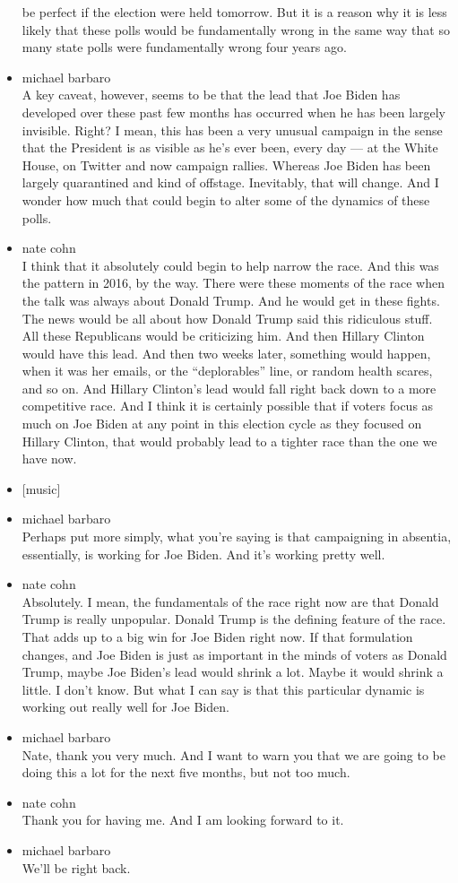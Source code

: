 \begin{itemize}
  be perfect if the election were held tomorrow. But it is a reason why
  it is less likely that these polls would be fundamentally wrong in the
  same way that so many state polls were fundamentally wrong four years
  ago.
\item
  michael barbaro\\
  A key caveat, however, seems to be that the lead that Joe Biden has
  developed over these past few months has occurred when he has been
  largely invisible. Right? I mean, this has been a very unusual
  campaign in the sense that the President is as visible as he's ever
  been, every day --- at the White House, on Twitter and now campaign
  rallies. Whereas Joe Biden has been largely quarantined and kind of
  offstage. Inevitably, that will change. And I wonder how much that
  could begin to alter some of the dynamics of these polls.
\item
  nate cohn\\
  I think that it absolutely could begin to help narrow the race. And
  this was the pattern in 2016, by the way. There were these moments of
  the race when the talk was always about Donald Trump. And he would get
  in these fights. The news would be all about how Donald Trump said
  this ridiculous stuff. All these Republicans would be criticizing him.
  And then Hillary Clinton would have this lead. And then two weeks
  later, something would happen, when it was her emails, or the
  ``deplorables'' line, or random health scares, and so on. And Hillary
  Clinton's lead would fall right back down to a more competitive race.
  And I think it is certainly possible that if voters focus as much on
  Joe Biden at any point in this election cycle as they focused on
  Hillary Clinton, that would probably lead to a tighter race than the
  one we have now.
\item
  {[}music{]}
\item
  michael barbaro\\
  Perhaps put more simply, what you're saying is that campaigning in
  absentia, essentially, is working for Joe Biden. And it's working
  pretty well.
\item
  nate cohn\\
  Absolutely. I mean, the fundamentals of the race right now are that
  Donald Trump is really unpopular. Donald Trump is the defining feature
  of the race. That adds up to a big win for Joe Biden right now. If
  that formulation changes, and Joe Biden is just as important in the
  minds of voters as Donald Trump, maybe Joe Biden's lead would shrink a
  lot. Maybe it would shrink a little. I don't know. But what I can say
  is that this particular dynamic is working out really well for Joe
  Biden.
\item
  michael barbaro\\
  Nate, thank you very much. And I want to warn you that we are going to
  be doing this a lot for the next five months, but not too much.
\item
  nate cohn\\
  Thank you for having me. And I am looking forward to it.
\item
  michael barbaro\\
  We'll be right back.


\end{itemize}
